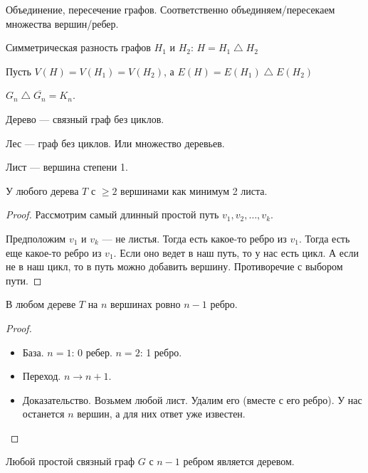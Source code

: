 \begin{definition}
    Объединение, пересечение графов. Соответственно объединяем/пересекаем множества вершин/ребер. 
\end{definition}
\begin{definition}
    Симметрическая разность графов $H_1$ и $H_2$: $H = H_1 \bigtriangleup H_2$

    Пусть $V(H) = V(H_1) = V(H_2)$, а $E(H) = E(H_1) \bigtriangleup E(H_2)$
\end{definition}
\begin{remark}
    $G_n \bigtriangleup \overline{G_n} = K_n$.
\end{remark}
\begin{definition}
    Дерево --- связный граф без циклов.
\end{definition}
\begin{definition}
    Лес --- граф без циклов. Или множество деревьев.
\end{definition}
\begin{definition}
    Лист --- вершина степени 1.
\end{definition}
\begin{lemma}
    У любого дерева $T$ с  $\ge 2$ вершинами как минимум 2 листа.
\end{lemma}
\begin{proof}
    Рассмотрим самый длинный простой путь $v_1, v_2, \ldots, v_k$. 

    Предположим $v_1$ и  $v_k$ --- не листья. Тогда есть какое-то ребро из  $v_1$. Тогда есть еще какое-то ребро из $v_1$. Если оно ведет в наш путь, то у нас есть цикл. А если не в наш цикл, то в путь можно добавить вершину. Противоречие с выбором пути. 
\end{proof}
 \begin{theorem}
    В любом дереве $T$ на  $n$ вершинах ровно  $n-1$ ребро.
\end{theorem}
\begin{proof}
    \slashn
    \begin{itemize}
        \item База. $n=1$: 0 ребер.  $n=2$: 1 ребро. 
        \item Переход. $n\to n+1$.
        \item Доказательство. Возьмем любой лист. Удалим его (вместе с его ребро). У нас останется $n$ вершин, а для них ответ уже известен.
    \end{itemize}
\end{proof}
\begin{theorem}
    Любой простой связный граф $G$ с  $n-1$ ребром является деревом.
\end{theorem}
